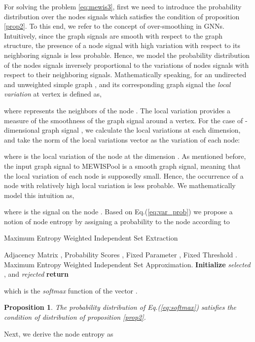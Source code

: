 \documentclass{article}
\newtheorem{prop}{Proposition}
\begin{document}
For solving the problem \ref{eq:mewis3}, first we need to introduce the probability distribution  over the nodes signals which satisfies the condition of proposition \ref{prop2}. To this end, we refer to the concept of over-smoothing in GNNs. Intuitively, since the graph signals are smooth with respect to the graph structure, the presence of a node signal with high variation with respect to its neighboring signals is less probable. Hence, we model the probability distribution of the nodes signals inversely proportional to the variations of nodes signals with respect to their neighboring signals. Mathematically speaking, for an undirected and unweighted simple graph , and its corresponding graph signal  the \textit{local variation}  at vertex  is defined as,

where  represents the neighbors of the node  \cite{emergingfields}. The local variation provides a measure of the smoothness of the graph signal  around a vertex. For the case of -dimensional graph signal , we calculate the local variations at each dimension, and take the  norm of the local variations vector as the variation of each node:

where  is the local variation of the node  at the dimension . As mentioned before, the input graph signal to MEWISPool is a smooth graph signal, meaning that the local variation of each node is supposedly small. Hence, the occurrence of a node with relatively high local variation is less probable. We mathematically model this intuition as,

where  is the signal on the node . Based on Eq.(\ref{eq:var_prob}) we propose a notion of node entropy by assigning a probability  to the node  according to

\begin{algorithm}[tb]
	\caption{Maximum Entropy Weighted Independent Set Extraction}
	\label{tab:1}
	\begin{algorithmic}[1]
		\REQUIRE Adjacency Matrix , Probability Scores , Fixed Parameter , Fixed Threshold .
		\ENSURE Maximum Entropy Weighted Independent Set Approximation.
		\STATE \textbf{Initialize} \textit{selected} , and \textit{rejected}  
		\IF{}
		\STATE 
		\STATE 
		\STATE 
		\IF{}
		\STATE 
		\STATE 
		\STATE 
		\STATE 
		\ENDIF
		\ENDIF
		\ENDFOR
		\STATE \textbf{return} 
	\end{algorithmic}
\end{algorithm}
which is the \textit{softmax} function of the vector . 
\begin{prop}\label{prop4}
	The probability distribution of Eq.(\ref{eq:softmax}) satisfies the condition of distribution  of proposition \ref{prop2}.
\end{prop}
Next, we derive the node entropy as
\end{document}

